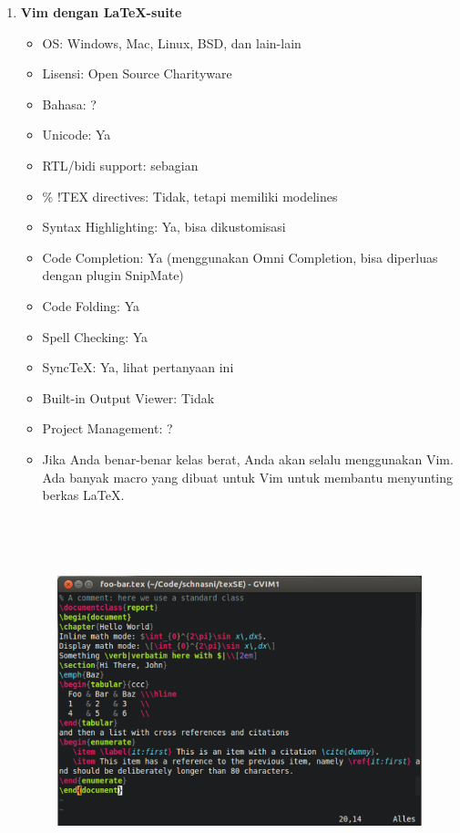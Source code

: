 \begin{enumerate}
\item \textbf{Vim dengan LaTeX-suite}
\begin{itemize}
\item OS: Windows, Mac, Linux, BSD, dan lain-lain
\item Lisensi: Open Source Charityware
\item Bahasa: ?
\item Unicode: Ya
\item RTL/bidi support: sebagian
\item \% !TEX directives: Tidak, tetapi memiliki modelines
\item Syntax Highlighting: Ya, bisa dikustomisasi
\item Code Completion: Ya (menggunakan Omni Completion, bisa diperluas dengan plugin SnipMate)
\item Code Folding: Ya
\item Spell Checking: Ya
\item SyncTeX: Ya, lihat pertanyaan ini
\item Built-in Output Viewer: Tidak
\item Project Management: ?
\item Jika Anda benar-benar kelas berat, Anda akan selalu menggunakan Vim. Ada banyak macro yang dibuat untuk Vim untuk membantu menyunting berkas LaTeX.
\end{itemize}
\begin{figure}[ht]

\includegraphics[width=15.57cm,height=10.66cm]{gambar/image4.jpg}
\end{figure}


\end{enumerate}
